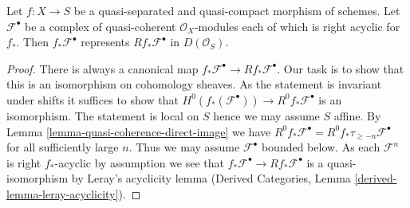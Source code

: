 \begin{lemma}
\label{lemma-acyclicity-lemma}
Let $f : X \to S$ be a quasi-separated and quasi-compact morphism
of schemes. Let $\mathcal{F}^\bullet$ be a complex of quasi-coherent
$\mathcal{O}_X$-modules each of which is right acyclic for $f_*$.
Then $f_*\mathcal{F}^\bullet$ represents $Rf_*\mathcal{F}^\bullet$
in $D(\mathcal{O}_S)$.
\end{lemma}

\begin{proof}
There is always a canonical map
$f_*\mathcal{F}^\bullet \to Rf_*\mathcal{F}^\bullet$.
Our task is to show that this is an isomorphism on cohomology sheaves.
As the statement is invariant under shifts it suffices to show that
$H^0(f_*(\mathcal{F}^\bullet)) \to R^0f_*\mathcal{F}^\bullet$
is an isomorphism. The statement is local on $S$ hence we
may assume $S$ affine. By
Lemma \ref{lemma-quasi-coherence-direct-image}
we have $R^0f_*\mathcal{F}^\bullet = R^0f_*\tau_{\geq -n}\mathcal{F}^\bullet$
for all sufficiently large $n$. Thus we may assume $\mathcal{F}^\bullet$
bounded below. As each $\mathcal{F}^n$ is right $f_*$-acyclic by
assumption we see that $f_*\mathcal{F}^\bullet \to Rf_*\mathcal{F}^\bullet$
is a quasi-isomorphism by Leray's acyclicity lemma (Derived Categories, Lemma
\ref{derived-lemma-leray-acyclicity}).
\end{proof}
